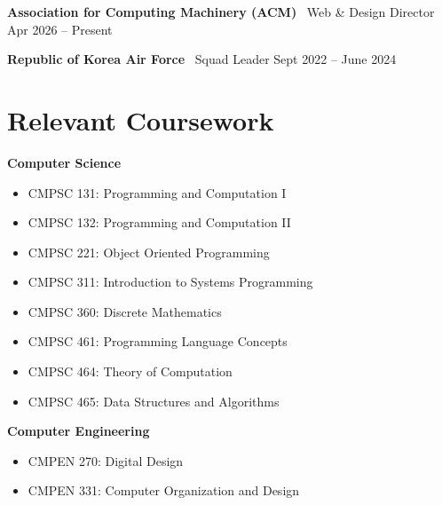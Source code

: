 \documentclass[11pt,a4paper]{article}
\begin{document}
\vspace{0.4em}

\textbf{Association for Computing Machinery (ACM)} \
Web \& Design Director \hfill Apr 2026 -- Present

\vspace{0.4em}

\textbf{Republic of Korea Air Force} \
Squad Leader \hfill Sept 2022 -- June 2024


\section*{Relevant Coursework}

\textbf{Computer Science}

\begin{itemize}[leftmargin=1.2em, itemsep=0.2em]

\item CMPSC 131: Programming and Computation I
\item CMPSC 132: Programming and Computation II
\item CMPSC 221: Object Oriented Programming
\item CMPSC 311: Introduction to Systems Programming
\item CMPSC 360: Discrete Mathematics
\item CMPSC 461: Programming Language Concepts
\item CMPSC 464: Theory of Computation
\item CMPSC 465: Data Structures and Algorithms

\end{itemize}

\vspace{0.4em}

\textbf{Computer Engineering}

\begin{itemize}[leftmargin=1.2em, itemsep=0.2em]

\item CMPEN 270: Digital Design
\item CMPEN 331: Computer Organization and Design

\end{itemize}

\end{document}
